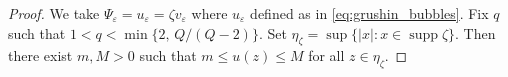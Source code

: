 \documentclass[11pt]{article}
\begin{document}
\begin{proof}
We take $\Psi_{\varepsilon} = u_{\varepsilon} = \zeta v_{\varepsilon}$ where $u_{\varepsilon}$ defined as in \eqref{eq:grushin_bubbles}. Fix $q$ such that $1 < q < \min\{2,\, Q/(Q-2)\}$. Set $\eta_\zeta = \sup\{ |x| : x \in \operatorname{supp}\zeta \}$. Then there exist $m, M > 0$ such that $m \leq u(z) \leq M$ for all $z \in \eta_{\zeta}$.

 

\end{proof}
\end{document}
